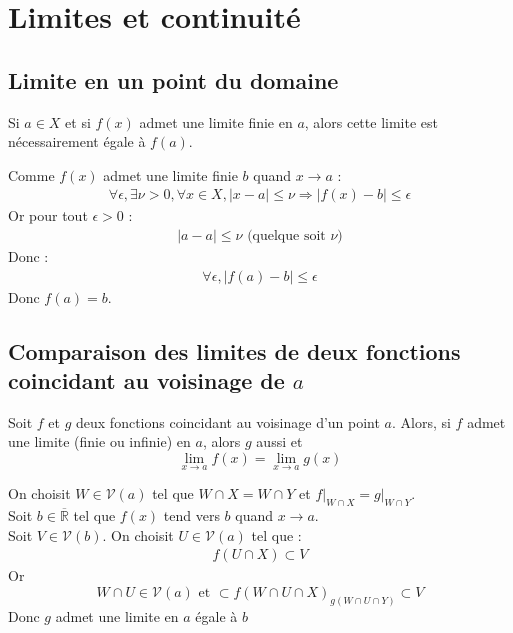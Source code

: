 \documentclass[../main.tex]{subfiles}
\begin{document}
\setcounter{chapter}{14}
\chapter{Limites et continuité}
\tableofcontents
\clearpage

\setcounter{section}{5}
\section{Limite en un point du domaine}
\begin{tcolorbox}[title=Propostion 15.6, title filled=false, colframe=lightblue, colback=lightblue!10!white]
    Si $a \in X$ et si $f(x)$ admet une limite finie en $a$, alors cette limite est nécessairement égale à $f(a)$. 
\end{tcolorbox}

Comme $f(x)$ admet une limite finie $b$ quand $x \to a$ : 
\begin{align*}
    \forall \epsilon, \exists \nu > 0, \forall x \in X, |x - a| \leq \nu \Rightarrow |f(x) - b| \leq \epsilon
\end{align*}
Or pour tout $\epsilon > 0$ : 
\begin{align*}
    |a - a| \leq \nu \text{ (quelque soit $\nu$)}
\end{align*}
Donc : 
\begin{align*}
    \forall \epsilon, |f(a) - b| \leq \epsilon
\end{align*}
Donc $\boxed{f(a) = b}$. 

\setcounter{section}{14}
\section{Comparaison des limites de deux fonctions coincidant au voisinage de $a$}
\begin{tcolorbox}[title=Propostion 15.15, title filled=false, colframe=lightblue, colback=lightblue!10!white]
    Soit $f$ et $g$ deux fonctions coincidant au voisinage d'un point $a$. Alors, si $f$ admet une limite (finie ou infinie) en $a$, alors $g$ aussi et
    $$\lim_{x\to a} f(x) = \lim_{x\to a} g(x)$$
\end{tcolorbox}

On choisit $W \in \mathcal{V}(a)$ tel que $W \cap X = W \cap Y$ et $\left. f \right|_{W \cap X} = \left. g \right|_{W \cap Y}$. \\
Soit $b \in \overline{\mathbb{R}}$ tel que $f(x)$ tend vers $b$ quand $x \to a$. \\
Soit $V \in \mathcal{V}(b)$. On choisit $U \in \mathcal{V}(a)$ tel que : 
\begin{align*}
    f(U \cap X) \subset V
\end{align*}
Or $$W \cap U \in \mathcal{V}(a) \text{ et } \subset{f(W \cap U \cap X)}_{g(W \cap U \cap Y)} \subset V$$
Donc $g$ admet une limite en $a$ égale à $b$
\end{document}
